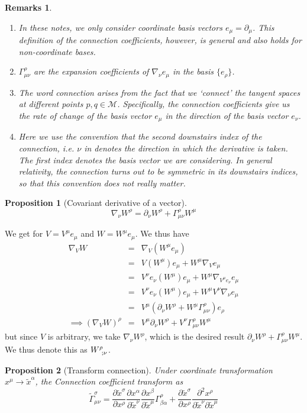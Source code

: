 \documentclass[a4paper]{article}
\newtheorem{remarks}{Remarks}[section]
\theoremstyle{new}
\newtheorem{prop}{Proposition}[section]
\begin{document}
\begin{remarks}\leavevmode
\begin{enumerate}
    \item In these notes, we only consider coordinate basis vectors $e_\mu = \partial_\mu$. This definition of the connection coefficients, however, is general and also holds for non-coordinate bases.
    \item $\Gamma_{\mu\nu}^\rho$ are the expansion coefficients of $\nabla_\nu e_\mu$ in the basis $\{e_\rho\}$.
    \item The word connection arises from the fact that we `connect' the tangent spaces at different points $p,q\in\mathcal{M}$. Specifically, the connection coefficients give us the rate of change of the basis vector $e_\mu$ in the direction of the basis vector $e_\nu$.
    \item Here we use the convention that the second downstairs index of the connection, i.e. $\nu$ in denotes the direction in which the derivative is taken. The first index denotes the basis vector we are considering. In general relativity, the connection turns out to be symmetric in its downstairs indices, so that this convention does not really matter.
\end{enumerate}
\end{remarks}
\begin{prop}[Covariant derivative of a vector]
$$\nabla_\nu W^\rho=\partial_\nu W^\rho+\Gamma_{\mu\nu}^\rho W^\mu$$
\end{prop}
We get for $V=V^\mu e_\mu$ and $W=W^\mu e_\mu$. We thus have
\begin{eqnarray}
\nabla_VW&=&\nabla_V(W^\mu e_\mu)\nonumber\\&=&V(W^\mu)e_\mu+W^\mu\nabla_Ve_\mu\nonumber\\&=&V^\nu e_\nu(W^\mu)e_\mu+W^\mu\nabla_{V^\mu e_\nu}e_\mu\nonumber\\&=&V^\nu e_\nu(W^\mu)e_\mu+W^\mu V^\nu\nabla_{\nu}e_\mu\nonumber\\&=&V^\mu(\partial_\nu W^\rho+W^\mu\Gamma_{\mu\nu}^\rho)e_\rho\nonumber\\\implies(\nabla_VW)^\rho&=&V^\mu\partial_\nu W^\rho+V^\nu\Gamma_{\mu\nu}^\rho W^\mu\nonumber
\end{eqnarray}
but since $V$ is arbitrary, we take $\nabla_\nu W^\rho$, which is the desired result $\partial_\nu W^\rho+\Gamma_{\mu\nu}^\rho W^\mu$. We thus denote this as $\tensor*{W}{*_{}^{\rho}_{;\nu}}$. 
\begin{prop}[Transform connection]
Under coordinate transformation $x^\mu\rightarrow\tilde{x}^\alpha$, the Connection coefficient transform as
$$\tilde{\Gamma}^\sigma_{\mu\nu}=\frac{\partial\tilde{x}^\sigma}{\partial x^\rho}\frac{\partial x^\alpha}{\partial\tilde{x}^\nu}\frac{\partial x^\beta}{\partial\tilde{x}^\mu}\Gamma_{\beta\alpha}^\rho+\frac{\partial\tilde{x}^\sigma}{\partial x^\rho}\frac{\partial^2x^\rho}{\partial\tilde{x}^\nu\partial\tilde{x}^\mu}$$
\end{prop}
\end{document}
